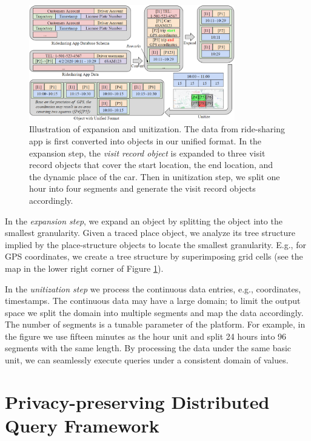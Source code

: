 \documentclass[11pt]{article}  %
\begin{document}
\begin{figure}
\centering
\includegraphics[width=0.8\textwidth, bb= 0 0 1280 721]{figs/procstep.png}
\caption{Illustration of expansion and unitization. The data from ride-sharing app is first converted into objects in our unified format. In the expansion step, the \emph{visit record object} is expanded to three visit record objects that cover the start location, the end location, and the dynamic place of the car. Then in unitization step, we split one hour into four segments and generate the visit record objects accordingly.}
\label{procstep}
\end{figure}

In the \emph{expansion step}, we expand an object by splitting the object into the smallest granularity. 
Given a traced place object, we analyze its tree structure implied by the  place-structure objects to locate the smallest granularity.
E.g., for GPS coordinates, we create a tree structure by superimposing grid cells (see the map in the lower right corner of Figure \ref{procstep}). 
 

In the \emph{unitization step} we process the continuous data entries, e.g., coordinates, timestamps. 
The continuous data may have a large domain; to limit the output space we split the domain into multiple segments and map the data accordingly. 
The number of segments is a tunable parameter of the platform. 
For example, in the figure we use fifteen minutes as the hour unit and split 24 hours into 96 segments with the same length. 
By processing the data under the same basic unit, we can seamlessly execute queries under a consistent domain of values.




\section{Privacy-preserving Distributed Query Framework}
\label{ppframework}
\end{document}
